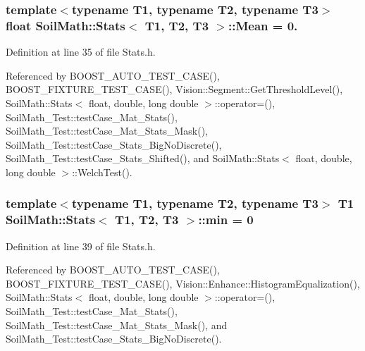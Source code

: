 \subsubsection[{Mean}]{\setlength{\rightskip}{0pt plus 5cm}template$<$typename T1, typename T2, typename T3$>$ float {\bf Soil\+Math\+::\+Stats}$<$ T1, T2, T3 $>$\+::Mean = 0.}\label{class_soil_math_1_1_stats_a6f53982d52cf492ddd4df9b56bd014e7}


Definition at line 35 of file Stats.\+h.



Referenced by B\+O\+O\+S\+T\+\_\+\+A\+U\+T\+O\+\_\+\+T\+E\+S\+T\+\_\+\+C\+A\+S\+E(), B\+O\+O\+S\+T\+\_\+\+F\+I\+X\+T\+U\+R\+E\+\_\+\+T\+E\+S\+T\+\_\+\+C\+A\+S\+E(), Vision\+::\+Segment\+::\+Get\+Threshold\+Level(), Soil\+Math\+::\+Stats$<$ float, double, long double $>$\+::operator=(), Soil\+Math\+\_\+\+Test\+::test\+Case\+\_\+\+Mat\+\_\+\+Stats(), Soil\+Math\+\_\+\+Test\+::test\+Case\+\_\+\+Mat\+\_\+\+Stats\+\_\+\+Mask(), Soil\+Math\+\_\+\+Test\+::test\+Case\+\_\+\+Stats\+\_\+\+Big\+No\+Discrete(), Soil\+Math\+\_\+\+Test\+::test\+Case\+\_\+\+Stats\+\_\+\+Shifted(), and Soil\+Math\+::\+Stats$<$ float, double, long double $>$\+::\+Welch\+Test().

\hypertarget{class_soil_math_1_1_stats_aa44c07a23b1c2ce0f0407e7cee4f39a9}{}
\subsubsection[{min}]{\setlength{\rightskip}{0pt plus 5cm}template$<$typename T1, typename T2, typename T3$>$ T1 {\bf Soil\+Math\+::\+Stats}$<$ T1, T2, T3 $>$\+::min = 0}\label{class_soil_math_1_1_stats_aa44c07a23b1c2ce0f0407e7cee4f39a9}


Definition at line 39 of file Stats.\+h.



Referenced by B\+O\+O\+S\+T\+\_\+\+A\+U\+T\+O\+\_\+\+T\+E\+S\+T\+\_\+\+C\+A\+S\+E(), B\+O\+O\+S\+T\+\_\+\+F\+I\+X\+T\+U\+R\+E\+\_\+\+T\+E\+S\+T\+\_\+\+C\+A\+S\+E(), Vision\+::\+Enhance\+::\+Histogram\+Equalization(), Soil\+Math\+::\+Stats$<$ float, double, long double $>$\+::operator=(), Soil\+Math\+\_\+\+Test\+::test\+Case\+\_\+\+Mat\+\_\+\+Stats(), Soil\+Math\+\_\+\+Test\+::test\+Case\+\_\+\+Mat\+\_\+\+Stats\+\_\+\+Mask(), and Soil\+Math\+\_\+\+Test\+::test\+Case\+\_\+\+Stats\+\_\+\+Big\+No\+Discrete().

\hypertarget{class_soil_math_1_1_stats_a7bc57af334b68253832ebac17f85d091}{}
